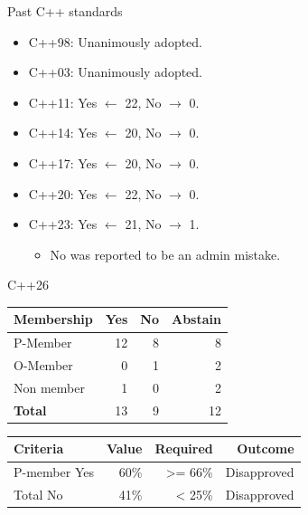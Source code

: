 \begin{frame}[t]{Past C++ standards}
\begin{itemize}
  \item C++98: Unanimously adopted.
  \item C++03: Unanimously adopted.
  \item C++11: Yes $\leftarrow$ 22, No $\rightarrow$ 0.
  \item C++14: Yes $\leftarrow$ 20, No $\rightarrow$ 0.
  \item C++17: Yes $\leftarrow$ 20, No $\rightarrow$ 0.
  \item C++20: Yes $\leftarrow$ 22, No $\rightarrow$ 0.
  \item C++23: Yes $\leftarrow$ 21, No $\rightarrow$ 1.
    \begin{itemize}
      \item No was reported to be an admin mistake.
    \end{itemize}
\end{itemize}
\end{frame}

\begin{frame}[t]{C++26}
\begin{center}
\begin{tabular}{|l|r|r|r|}

\hline
\textbf{Membership} & \textbf{Yes} & \textbf{No} & \textbf{Abstain} \\
\hline\hline
P-Member & 12 & 8 & 8 \\
\hline
O-Member & 0 & 1 & 2 \\
\hline 
Non member & 1 & 0 & 2 \\
\hline
\hline
\textbf{Total} & 13 & 9 & 12 \\
\hline
\end{tabular}

\vfill

\begin{tabular}{|l|r|r|r|}
\hline

\textbf{Criteria} & \textbf{Value} & \textbf{Required} & \textbf{Outcome} \\
\hline
P-member Yes & 60\% & >= 66\% & Disapproved \\
\hline
Total No & 41\% & < 25\% & Disapproved \\
\hline

\end{tabular}

\end{center}
\end{frame}